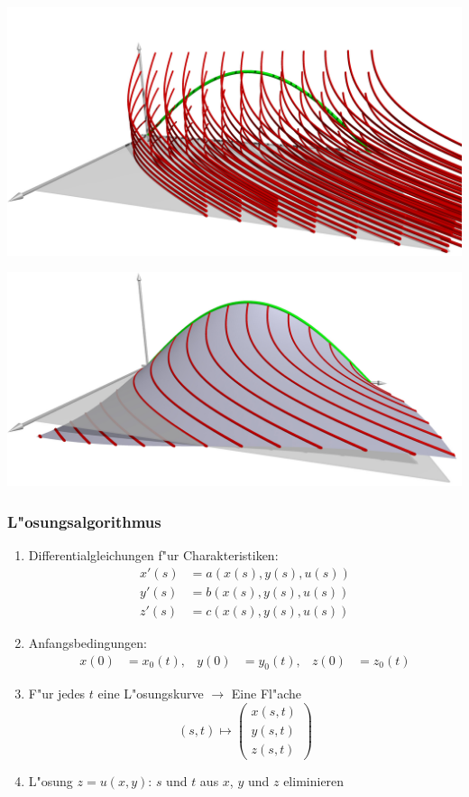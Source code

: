 \documentclass{beamer}
\begin{document}
\begin{frame}
\begin{center}
\includegraphics[width=\hsize]{../../skript/3d/chr.jpg}
\end{center}
\end{frame}

\begin{frame}
\begin{center}
\includegraphics[width=\hsize]{../../skript/3d/sol.jpg}
\end{center}
\end{frame}

\begin{frame}
\frametitle{L"osungsalgorithmus}
\begin{enumerate}
\item Differentialgleichungen f"ur Charakteristiken:
\pause
\begin{align*}
x'(s)&=a(x(s),y(s),u(s))\\
y'(s)&=b(x(s),y(s),u(s))\\
z'(s)&=c(x(s),y(s),u(s))
\end{align*}
\pause
\item Anfangsbedingungen:
\pause
\begin{align*}
x(0)&=x_0(t),&
y(0)&=y_0(t),&
z(0)&=z_0(t)
\end{align*}%
\pause
\item F"ur jedes $t$ eine L"osungskurve $\to$ Eine Fl"ache
\pause
\[
(s,t)\mapsto\begin{pmatrix}
x(s,t)\\
y(s,t)\\
z(s,t)
\end{pmatrix}
\]
\pause
\item L"osung $z=u(x,y)$:
\pause
$s$ und $t$ aus $x$, $y$ und $z$ eliminieren
\end{enumerate}
\end{frame}
\end{document}
